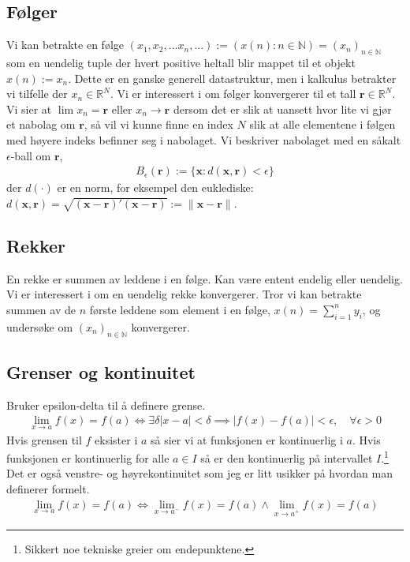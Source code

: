 \subsection{Følger}
Vi kan betrakte en følge $(x_1,x_2,...x_n,...) := (x(n):n\in\mathbb{N}) = (x_n)_{n\in\mathbb{N}}$ som en uendelig tuple der hvert positive heltall blir mappet til et objekt $x(n) := x_n$. Dette er en ganske generell datastruktur, men i kalkulus betrakter vi tilfelle der $x_n \in \mathbb{R}^N$. Vi er interessert i om følger konvergerer til et tall $\mathbf{r} \in \mathbb{R}^N$. Vi sier at $\lim x_n = \mathbf{r}$ eller $x_n \to \mathbf{r}$ dersom det er slik at uansett hvor lite vi gjør et nabolag om $\mathbf{r}$, så vil vi kunne finne en index $N$ slik at alle elementene i følgen med høyere indeks befinner seg i nabolaget. Vi beskriver nabolaget med en såkalt $\epsilon$-ball om $\mathbf{r}$,
\begin{align}
B_{\epsilon}(\mathbf{r}) := \{\mathbf{x}:d(\mathbf{x},\mathbf{r}) < \epsilon \}
\end{align}
der $d(\cdot)$ er en norm, for eksempel den euklediske:$d(\mathbf{x},\mathbf{r}) = \sqrt{\mathbf{(x-r)}'\mathbf{(x-r)}} := \lVert \mathbf{x}-\mathbf{r} \rVert$.
\subsection{Rekker}
En rekke er summen av leddene i en følge. Kan være entent endelig eller uendelig. Vi er interessert i om en uendelig rekke konvergerer. Tror vi kan betrakte summen av de $n$ første leddene som element i en følge, $x(n)=\sum_{i=1}^n y_i$, og undersøke om $(x_n)_{n\in\mathbb{N}}$ konvergerer.
\subsection{Grenser og kontinuitet}
Bruker epsilon-delta til å definere grense.
\begin{align}
\lim_{x\to a} f(x)=f(a) \iff \exists \delta |x-a|<\delta \implies |f(x)-f(a)|< \epsilon, \quad \forall \epsilon >0
\end{align}
Hvis grensen til $f$ eksister i $a$ så sier vi at funksjonen er kontinuerlig i $a$. Hvis funksjonen er kontinuerlig for alle $a \in I$ så er den kontinuerlig på intervallet $I$.\footnote{Sikkert noe tekniske greier om endepunktene.} Det er også venstre- og høyrekontinuitet som jeg er litt usikker på hvordan man definerer formelt.
\begin{align}
\lim_{x\to a} f(x)=f(a) \iff \lim_{x\to a^-} f(x)=f(a) \land \lim_{x\to a^+} f(x)=f(a)
\end{align}
